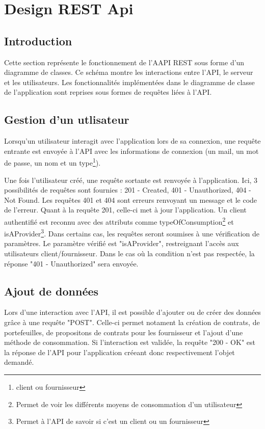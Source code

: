 \section{Design REST Api}
\subsection{Introduction}
\begin{flushleft}
Cette section représente le fonctionnement de l'AAPI REST sous forme d'un diagramme de classes. Ce schéma montre les interactions entre l'API, le serveur et les utilisateurs. Les fonctionnalités implémentées dans le diagramme de classe de l'application sont reprises sous formes de requêtes liées à l'API.
\end{flushleft}

\subsection{Gestion d'un utlisateur}
\begin{flushleft}
Lorsqu'un utilisateur interagit avec l'application lors de sa connexion, une requête entrante est envoyée à l'API avec les informations de connexion (un mail, un mot de passe, un nom et un type\footnote{client ou fournisseur}).
\end{flushleft}

\begin{flushleft}
Une fois l'utilisateur créé, une requête sortante est renvoyée à l'application. Ici, 3 possibilités de requêtes sont fournies : 201 - Created, 401 - Unauthorized, 404 - Not Found. Les requêtes 401 et 404 sont erreurs renvoyant un message et le code de l'erreur. Quant à la requête 201, celle-ci met à jour l'application. Un client authentifié est reconnu avec des attributs comme typeOfConsumption\footnote{Permet de voir les différents moyens de consommation d'un utilisateur} et isAProvider\footnote{Permet à l'API de savoir si c'est un client ou un fournisseur}. Dans certains cas, les requêtes seront soumises à une vérification de paramètres. Le paramètre vérifié est "isAProvider", restreignant l'accès aux utilisateurs client/fournisseur. Dans le cas où la condition n'est pas respectée, la réponse "401 - Unauthorized" sera envoyée.
\end{flushleft}

\subsection{Ajout de données}
\begin{flushleft}
Lors d'une interaction avec l'API, il est possible d'ajouter ou de créer des données grâce à une requête "POST". Celle-ci permet notament la création de contrats, de portefeuilles, de propositons de contrats pour les fournisseur et l'ajout d'une méthode de consommation. Si l'interaction est validée, la requête "200 - OK" est la réponse de l'API pour l'application créeant donc respectivement l'objet demandé.
\end{flushleft}

